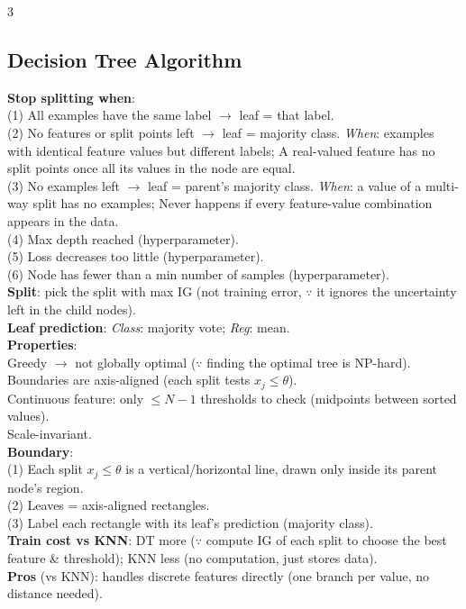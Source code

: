 \documentclass[10pt]{article}
\newcommand{\sub}[1]{\textit{#1}:}  %
\begin{document}
\begin{multicols*}{3}
\subsection{Decision Tree Algorithm}
\textbf{Stop splitting when}:\\
(1) All examples have the same label $\to$ leaf = that label.\\
(2) No features or split points left $\to$ leaf = majority class. \sub{When} examples with identical feature values but different labels; A real-valued feature has no split points once all its values in the node are equal.\\
(3) No examples left $\to$ leaf = parent's majority class. \sub{When} a value of a multi-way split has no examples; Never happens if every feature-value combination appears in the data.\\
(4) Max depth reached (hyperparameter).\\
(5) Loss decreases too little (hyperparameter).\\
(6) Node has fewer than a min number of samples (hyperparameter).\\
\textbf{Split}: pick the split with max IG (not training error, $\because$ it ignores the uncertainty left in the child nodes).\\
\textbf{Leaf prediction}: \sub{Class} majority vote; \sub{Reg} mean.\\
\textbf{Properties}:\\
Greedy $\to$ not globally optimal ($\because$ finding the optimal tree is NP-hard).\\
Boundaries are axis-aligned (each split tests $x_j\le\theta$).\\
Continuous feature: only $\le N\!-\!1$ thresholds to check (midpoints between sorted values).\\
Scale-invariant.\\
\textbf{Boundary}:\\
(1) Each split $x_j\le\theta$ is a vertical/horizontal line, drawn only inside its parent node's region.\\
(2) Leaves = axis-aligned rectangles.\\
(3) Label each rectangle with its leaf's prediction (majority class).\\
\textbf{Train cost vs KNN}: DT more ($\because$ compute IG of each split to choose the best feature \& threshold); KNN less (no computation, just stores data).\\
\textbf{Pros} (vs KNN): handles discrete features directly (one branch per value, no distance needed).


\end{multicols*}
\end{document}
